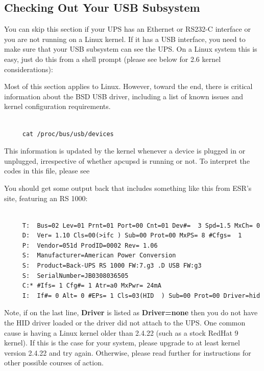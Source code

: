 \label{Checking-Out-Your-USB-Subsystem}

\subsection*{Checking Out Your USB Subsystem}

You can skip this section if your UPS has an Ethernet or RS232-C interface or
you are not running on a Linux kernel.  If it has a USB interface, you need to
make sure that your USB subsystem can see the UPS. On a Linux system this is
easy, just do this from a shell prompt (please see below for 2.6 kernel
considerations):  

Most of this section applies to Linux. However, toward the end, there is
critical information about the BSD USB driver, including a list of known
issues and kernel configuration requirements. 

\footnotesize
\begin{verbatim}
     
     cat /proc/bus/usb/devices
\end{verbatim}
\normalsize

This information is updated by the kernel whenever a device is plugged in or
unplugged, irrespective of whether apcupsd is running or not. To interpret the
codes in this file, please see 

You should get some output back that includes something like this from ESR's
site, featuring an RS 1000: 

\footnotesize
\begin{verbatim}
     
     T:  Bus=02 Lev=01 Prnt=01 Port=00 Cnt=01 Dev#=  3 Spd=1.5 MxCh= 0
     D:  Ver= 1.10 Cls=00(>ifc ) Sub=00 Prot=00 MxPS= 8 #Cfgs=  1
     P:  Vendor=051d ProdID=0002 Rev= 1.06
     S:  Manufacturer=American Power Conversion
     S:  Product=Back-UPS RS 1000 FW:7.g3 .D USB FW:g3
     S:  SerialNumber=JB0308036505
     C:* #Ifs= 1 Cfg#= 1 Atr=a0 MxPwr= 24mA
     I:  If#= 0 Alt= 0 #EPs= 1 Cls=03(HID  ) Sub=00 Prot=00 Driver=hid
\end{verbatim}
\normalsize

Note, if on the last line, {\bf Driver} is listed as {\bf Driver=none} then
you do not have the HID driver loaded or the driver did not attach to the UPS.
One common cause is having a Linux kernel older than 2.4.22 (such as a stock
RedHat 9 kernel). If this is the case for your system, please upgrade to at
least kernel version 2.4.22 and try again.  Otherwise, please read further for
instructions for other possible courses of action.  

